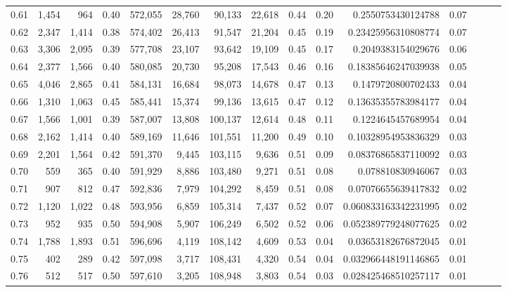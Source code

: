 \begin{tabular}{rrrrrrrrrrrrrrr}
0.61 &   1,454 &    964 &  0.40 &  572,055 &   28,760 &   90,133 &   22,618 &  0.44 &  0.20 &      0.2550753430124788 &      0.07 \\
0.62 &   2,347 &  1,414 &  0.38 &  574,402 &   26,413 &   91,547 &   21,204 &  0.45 &  0.19 &     0.23425956310808774 &      0.07 \\
0.63 &   3,306 &  2,095 &  0.39 &  577,708 &   23,107 &   93,642 &   19,109 &  0.45 &  0.17 &      0.2049383154029676 &      0.06 \\
0.64 &   2,377 &  1,566 &  0.40 &  580,085 &   20,730 &   95,208 &   17,543 &  0.46 &  0.16 &     0.18385646247039938 &      0.05 \\
0.65 &   4,046 &  2,865 &  0.41 &  584,131 &   16,684 &   98,073 &   14,678 &  0.47 &  0.13 &      0.1479720800702433 &      0.04 \\
0.66 &   1,310 &  1,063 &  0.45 &  585,441 &   15,374 &   99,136 &   13,615 &  0.47 &  0.12 &     0.13635355783984177 &      0.04 \\
0.67 &   1,566 &  1,001 &  0.39 &  587,007 &   13,808 &  100,137 &   12,614 &  0.48 &  0.11 &      0.1224645457689954 &      0.04 \\
0.68 &   2,162 &  1,414 &  0.40 &  589,169 &   11,646 &  101,551 &   11,200 &  0.49 &  0.10 &     0.10328954953836329 &      0.03 \\
0.69 &   2,201 &  1,564 &  0.42 &  591,370 &    9,445 &  103,115 &    9,636 &  0.51 &  0.09 &     0.08376865837110092 &      0.03 \\
0.70 &     559 &    365 &  0.40 &  591,929 &    8,886 &  103,480 &    9,271 &  0.51 &  0.08 &       0.078810830946067 &      0.03 \\
0.71 &     907 &    812 &  0.47 &  592,836 &    7,979 &  104,292 &    8,459 &  0.51 &  0.08 &     0.07076655639417832 &      0.02 \\
0.72 &   1,120 &  1,022 &  0.48 &  593,956 &    6,859 &  105,314 &    7,437 &  0.52 &  0.07 &    0.060833163342231995 &      0.02 \\
0.73 &     952 &    935 &  0.50 &  594,908 &    5,907 &  106,249 &    6,502 &  0.52 &  0.06 &    0.052389779248077625 &      0.02 \\
0.74 &   1,788 &  1,893 &  0.51 &  596,696 &    4,119 &  108,142 &    4,609 &  0.53 &  0.04 &     0.03653182676872045 &      0.01 \\
0.75 &     402 &    289 &  0.42 &  597,098 &    3,717 &  108,431 &    4,320 &  0.54 &  0.04 &    0.032966448191146865 &      0.01 \\
0.76 &     512 &    517 &  0.50 &  597,610 &    3,205 &  108,948 &    3,803 &  0.54 &  0.03 &    0.028425468510257117 &      0.01 \\

\end{tabular}
